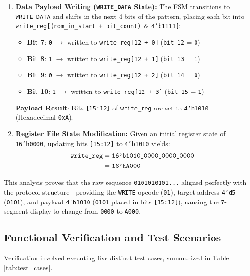 \documentclass[conference]{IEEEtran}
\begin{document}
\begin{enumerate}
    \item \textbf{Data Payload Writing (\texttt{WRITE\_DATA} State):}
    The FSM transitions to \texttt{WRITE\_DATA} and shifts in the next 4 bits of the pattern, placing each bit into \texttt{write\_reg[(rom\_in\_start + bit\_count) \& 4'b1111]}:
    \begin{itemize}
        \item \textbf{Bit 7}: \texttt{0} $\rightarrow$ written to \texttt{write\_reg[12 + 0]} (\texttt{bit 12} = \texttt{0})
        \item \textbf{Bit 8}: \texttt{1} $\rightarrow$ written to \texttt{write\_reg[12 + 1]} (\texttt{bit 13} = \texttt{1})
        \item \textbf{Bit 9}: \texttt{0} $\rightarrow$ written to \texttt{write\_reg[12 + 2]} (\texttt{bit 14} = \texttt{0})
        \item \textbf{Bit 10}: \texttt{1} $\rightarrow$ written to \texttt{write\_reg[12 + 3]} (\texttt{bit 15} = \texttt{1})
    \end{itemize}
    \textbf{Payload Result}: Bits \texttt{[15:12]} of \texttt{write\_reg} are set to \texttt{4'b1010} (Hexadecimal \texttt{0xA}).

    \item \textbf{Register File State Modification:}
    Given an initial register state of \texttt{16'h0000}, updating bits \texttt{[15:12]} to \texttt{4'b1010} yields:
    \begin{align}
        \texttt{write\_reg} &= \text{\texttt{16'b1010\_0000\_0000\_0000}} \nonumber \\
        &= \text{\texttt{16'hA000}}
    \end{align}
\end{enumerate}

This analysis proves that the raw sequence \texttt{0101010101...} aligned perfectly with the protocol structure—providing the \texttt{WRITE} opcode (\texttt{01}), target address \texttt{4'd5} (\texttt{0101}), and payload \texttt{4'b1010} (\texttt{0101} placed in bits \texttt{[15:12]}), causing the 7-segment display to change from \texttt{0000} to \texttt{A000}.


\subsection{Functional Verification and Test Scenarios}
Verification involved executing five distinct test cases, summarized in Table \ref{tab:test_cases}.
\end{document}
